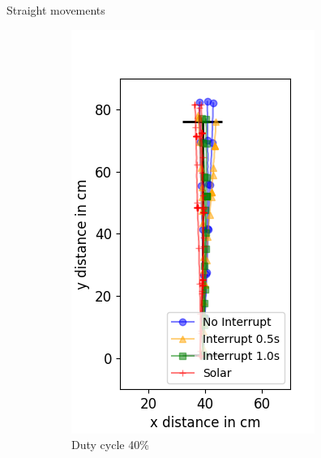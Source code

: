 \documentclass{beamer}
\begin{document}
\begin{frame}{Straight movements}
	\begin{figure}
		\centering
		\begin{subfigure}[b]{0.32\textwidth}
			\includegraphics[width=\textwidth]{pics/straight_40.png}
			\caption*{Duty cycle 40\%}
		\end{subfigure}
		\hspace{2em}
		\begin{subfigure}[b]{0.32\textwidth}

\end{subfigure}
\end{figure}
\end{frame}
\end{document}
